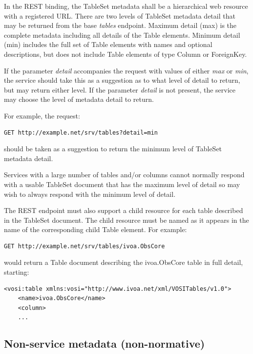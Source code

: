 \documentclass[11pt,letter]{ivoa}
\begin{document}
In the REST binding, the TableSet metadata shall be a hierarchical web resource with a registered URL.  There are two levels of TableSet metadata detail that may be returned from the base \textit{tables} endpoint.  Maximum detail (max) is the complete metadata including all details of the Table elements.  Minimum detail (min) includes the full set of Table elements with names and optional descriptions, but does not include Table elements of type Column or ForeignKey.

If the parameter \textit{detail} accompanies the request with values of either \textit{max} or \textit{min}, the service should take this as a suggestion as to what level of detail to return, but may return either level.  If the parameter \textit{detail} is not present, the service may choose the level of metadata detail to return.

For example, the request:

\begin{verbatim}
GET http://example.net/srv/tables?detail=min
\end{verbatim}

should be taken as a suggestion to return the minimum level of TableSet metadata detail.

Services with a large number of tables and/or columns cannot normally respond with a usable TableSet document that has the maximum level of detail so may wish to always respond with the minimum level of detail.

The REST endpoint must also support a child resource for each table described in the TableSet document.  The child resource must be named as it appears in the name of the corresponding child Table element.  For example:

\begin{verbatim}
GET http://example.net/srv/tables/ivoa.ObsCore
\end{verbatim}

would return a Table document describing the ivoa.ObsCore table in full detail, starting:

\begin{verbatim}
<vosi:table xmlns:vosi="http://www.ivoa.net/xml/VOSITables/v1.0">
    <name>ivoa.ObsCore</name>
    <column>
    ...
\end{verbatim} 

\subsection{Non-service metadata (non-normative)}
\end{document}
